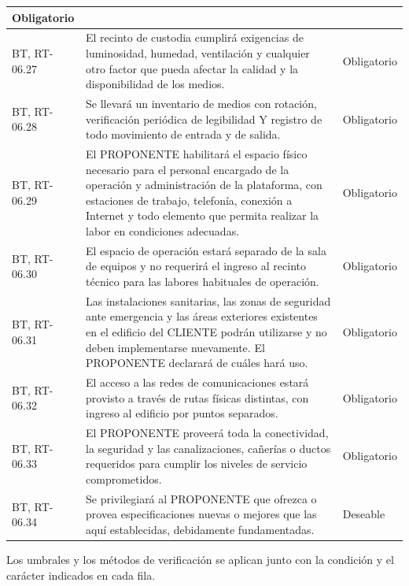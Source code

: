 \begin{longtable}{|L{0.098425\AnchoTablaAnexo}|L{0.814961\AnchoTablaAnexo}|L{0.086614\AnchoTablaAnexo}|}
Obligatorio \\ \hline
{}
BT, RT-06.27 &
El recinto de custodia cumplirá exigencias de luminosidad, humedad, ventilación y cualquier otro factor que pueda afectar la calidad y la disponibilidad de los medios. &
Obligatorio \\ \hline
BT, RT-06.28 &
Se llevará un inventario de medios con rotación, verificación periódica de legibilidad Y registro de todo movimiento de entrada y de salida. &
Obligatorio \\ \hline
{}
BT, RT-06.29 &
El PROPONENTE habilitará el espacio físico necesario para el personal encargado de la operación y administración de la plataforma, con estaciones de trabajo, telefonía, conexión a Internet y todo elemento que permita realizar la labor en condiciones adecuadas. &
Obligatorio \\ \hline
BT, RT-06.30 &
El espacio de operación estará separado de la sala de equipos y no requerirá el ingreso al recinto técnico para las labores habituales de operación. &
Obligatorio \\ \hline
{}
BT, RT-06.31 &
Las instalaciones sanitarias, las zonas de seguridad ante emergencia y las áreas exteriores existentes en el edificio del CLIENTE podrán utilizarse y no deben implementarse nuevamente. El PROPONENTE declarará de cuáles hará uso. &
Obligatorio \\ \hline
BT, RT-06.32 &
El acceso a las redes de comunicaciones estará provisto a través de rutas físicas distintas, con ingreso al edificio por puntos separados. &
Obligatorio \\ \hline
{}
BT, RT-06.33 &
El PROPONENTE proveerá toda la conectividad, la seguridad y las canalizaciones, cañerías o ductos requeridos para cumplir los niveles de servicio comprometidos. &
Obligatorio \\ \hline
BT, RT-06.34 &
Se privilegiará al PROPONENTE que ofrezca o provea especificaciones nuevas o mejores que las aquí establecidas, debidamente fundamentadas. &
Deseable \\ \hline
\end{longtable}

Los umbrales y los métodos de verificación se aplican junto con la condición y el carácter indicados en cada fila.
